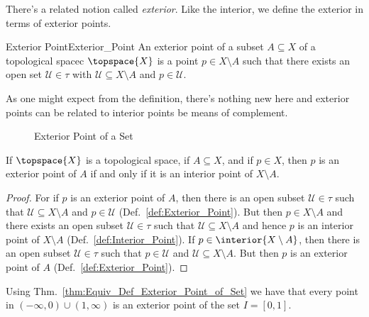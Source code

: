        There's a related notion called \textit{exterior}. Like the
        interior, we define the exterior in terms of exterior points.
        \begin{fdefinition}{Exterior Point}{Exterior_Point}
            An exterior point of a subset $A\subseteq{X}$ of a topological
            spacec $\topspace{X}$ is a point $p\in{X}\setminus{A}$ such that
            there exists an open set $\mathcal{U}\in\tau$ with
            $\mathcal{U}\subseteq{X}\setminus{A}$ and $p\in\mathcal{U}$.
        \end{fdefinition}
        As one might expect from the definition, there's nothing new here
        and exterior points can be related to interior points be means of
        complement.
        \begin{figure}[H]
            \centering
            \captionsetup{type=figure}
            
            \caption{Exterior Point of a Set}
            \label{fig:Exterior_Points}
        \end{figure}
        \begin{theorem}
            \label{thm:Equiv_Def_Exterior_Point_of_Set}%
            If $\topspace{X}$ is a topological space, if $A\subseteq{X}$,
            and if $p\in{X}$, then $p$ is an exterior point of $A$ if and
            only if it is an interior point of $X\setminus{A}$.
        \end{theorem}
        \begin{proof}
            For if $p$ is an exterior point of $A$, then there is an open
            subset $\mathcal{U}\in\tau$ such that
            $\mathcal{U}\subseteq{X}\setminus{A}$ and $p\in\mathcal{U}$
            (Def.~\ref{def:Exterior_Point}). But then $p\in{X}\setminus{A}$
            and there exists an open subset $\mathcal{U}\in\tau$ such that
            $\mathcal{U}\subseteq{X}\setminus{A}$ and hence $p$ is an
            interior point of $X\setminus{A}$
            (Def.~\ref{def:Interior_Point}). If
            $p\in\interior{X\setminus{A}}$, then there is an open subset
            $\mathcal{U}\in\tau$ such that $p\in\mathcal{U}$ and
            $\mathcal{U}\subseteq{X}\setminus{A}$. But then $p$ is an
            exterior point of $A$ (Def.~\ref{def:Exterior_Point}).
        \end{proof}
        \begin{example}
            Using Thm.~\ref{thm:Equiv_Def_Exterior_Point_of_Set} we have
            that every point in $(\minus\infty,0)\cup(1,\infty)$ is an
            exterior point of the set $I=[0,1]$.
        \end{example}

